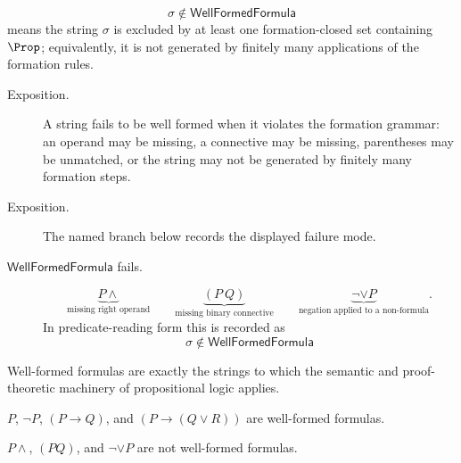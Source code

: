 \begin{remark*}
\[
  \sigma\notin\mathsf{WellFormedFormula}
\] means the string \(\sigma\) is excluded by at least one formation-closed set containing \(\Prop\); equivalently, it is not generated by finitely many applications of the formation rules.
\end{remark*}

\begin{remark*}
\begin{description}
  \item[Exposition.] A string fails to be well formed when it violates the formation grammar: an
operand may be missing, a connective may be missing, parentheses may be
unmatched, or the string may not be generated by finitely many formation steps.
\end{description}
\end{remark*}

\begin{remark*}
\begin{description}
  \item[Exposition.] The named branch below records the displayed failure mode.
\item[\(\mathsf{WellFormedFormula}\) fails.] \[
\underbrace{P\land}_{\text{missing right operand}}
\qquad
\underbrace{(P\ Q)}_{\text{missing binary connective}}
\qquad
\underbrace{\neg\lor P}_{\text{negation applied to a non-formula}}.
\]
  In predicate-reading form this is recorded as
  \[
    \sigma\notin\mathsf{WellFormedFormula}
  \]
\end{description}
\end{remark*}

\begin{remark*}[Interpretation]
Well-formed formulas are exactly the strings to which the semantic and proof-theoretic machinery of propositional logic applies.
\end{remark*}

\begin{remark*}[Examples]
\(P\), \(\neg P\), \((P\to Q)\), and \((P\to(Q\lor R))\) are well-formed formulas.
\end{remark*}

\begin{remark*}
\(P\land\), \((P Q)\), and \(\neg\lor P\) are not well-formed formulas.
\end{remark*}

